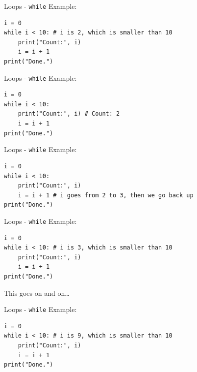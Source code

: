\documentclass[dvipsnames, svgnames, x11names, handout]{beamer}
\begin{document}
\addtocounter{framenumber}{-1}

\begin{frame}[fragile]{Loops - \texttt{while}}
Example:
\begin{verbatim}
i = 0
while i < 10: # i is 2, which is smaller than 10
    print("Count:", i)
    i = i + 1
print("Done.")
\end{verbatim}
\end{frame}

\addtocounter{framenumber}{-1}

\begin{frame}[fragile]{Loops - \texttt{while}}
Example:
\begin{verbatim}
i = 0
while i < 10: 
    print("Count:", i) # Count: 2
    i = i + 1
print("Done.")
\end{verbatim}
\end{frame}

\addtocounter{framenumber}{-1}

\begin{frame}[fragile]{Loops - \texttt{while}}
Example:
\begin{verbatim}
i = 0
while i < 10: 
    print("Count:", i)
    i = i + 1 # i goes from 2 to 3, then we go back up
print("Done.")
\end{verbatim}
\end{frame}

\addtocounter{framenumber}{-1}

\begin{frame}[fragile]{Loops - \texttt{while}}
Example:
\begin{verbatim}
i = 0
while i < 10: # i is 3, which is smaller than 10
    print("Count:", i)
    i = i + 1
print("Done.")
\end{verbatim}

This goes on and on\dots
\end{frame}

\addtocounter{framenumber}{-1}

\begin{frame}[fragile]{Loops - \texttt{while}}
Example:
\begin{verbatim}
i = 0
while i < 10: # i is 9, which is smaller than 10
    print("Count:", i)
    i = i + 1
print("Done.")
\end{verbatim}
\end{frame}
\end{document}
